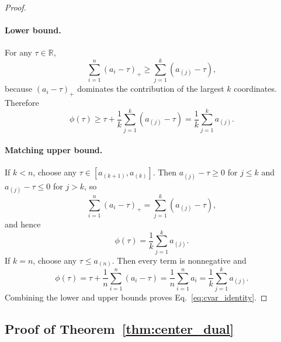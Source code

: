 \documentclass{article}
\newcommand{\RR}{\mathbb{R}}
\begin{document}
\begin{proof}
\paragraph{Lower bound.}
For any \(\tau\in\RR\),
\[
\sum_{i=1}^{n}(a_i-\tau)_+
\ge
\sum_{j=1}^{k}(a_{(j)}-\tau),
\]
because \((a_i-\tau)_+\) dominates the contribution of the largest \(k\) coordinates. Therefore
\[
\phi(\tau)
\ge
\tau + \frac{1}{k}\sum_{j=1}^{k}(a_{(j)}-\tau)
=
\frac{1}{k}\sum_{j=1}^{k} a_{(j)}.
\]

\paragraph{Matching upper bound.}
If \(k<n\), choose any \(\tau\in[a_{(k+1)},a_{(k)}]\). Then \(a_{(j)}-\tau\ge 0\) for \(j\le k\) and \(a_{(j)}-\tau\le 0\) for \(j>k\), so
\[
\sum_{i=1}^{n}(a_i-\tau)_+
=
\sum_{j=1}^{k}(a_{(j)}-\tau),
\]
and hence
\[
\phi(\tau)
=
\frac{1}{k}\sum_{j=1}^{k} a_{(j)}.
\]
If \(k=n\), choose any \(\tau\le a_{(n)}\). Then every term is nonnegative and
\[
\phi(\tau)
=
\tau + \frac{1}{n}\sum_{i=1}^{n}(a_i-\tau)
=
\frac{1}{n}\sum_{i=1}^{n}a_i
=
\frac{1}{k}\sum_{j=1}^{k}a_{(j)}.
\]
Combining the lower and upper bounds proves Eq.~\eqref{eq:cvar_identity}.
\end{proof}

\subsection{Proof of Theorem~\ref{thm:center_dual}}
\end{document}
